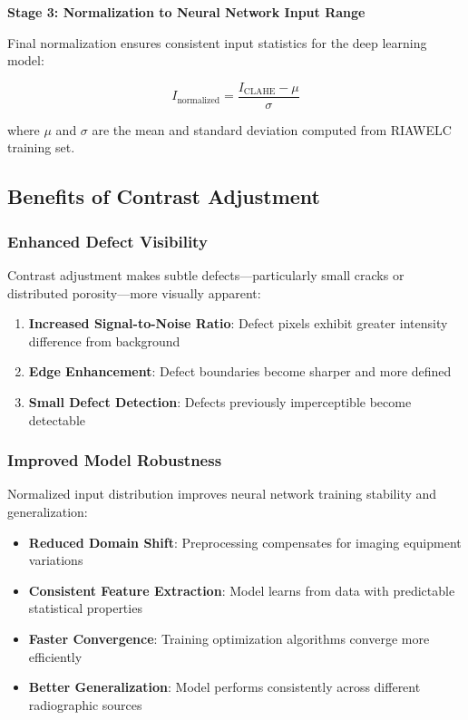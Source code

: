 \documentclass[12pt,a4paper]{report}
\begin{document}
\textbf{Stage 3: Normalization to Neural Network Input Range}

Final normalization ensures consistent input statistics for the deep learning model:

\begin{equation}
I_{\text{normalized}} = \frac{I_{\text{CLAHE}} - \mu}{\sigma}
\end{equation}

where $\mu$ and $\sigma$ are the mean and standard deviation computed from RIAWELC training set.

\subsection{Benefits of Contrast Adjustment}

\subsubsection{Enhanced Defect Visibility}

Contrast adjustment makes subtle defects---particularly small cracks or distributed porosity---more visually apparent:

\begin{enumerate}
    \item \textbf{Increased Signal-to-Noise Ratio}: Defect pixels exhibit greater intensity difference from background
    \item \textbf{Edge Enhancement}: Defect boundaries become sharper and more defined
    \item \textbf{Small Defect Detection}: Defects previously imperceptible become detectable
\end{enumerate}

\subsubsection{Improved Model Robustness}

Normalized input distribution improves neural network training stability and generalization:

\begin{itemize}
    \item \textbf{Reduced Domain Shift}: Preprocessing compensates for imaging equipment variations
    \item \textbf{Consistent Feature Extraction}: Model learns from data with predictable statistical properties
    \item \textbf{Faster Convergence}: Training optimization algorithms converge more efficiently
    \item \textbf{Better Generalization}: Model performs consistently across different radiographic sources
\end{itemize}
\end{document}
